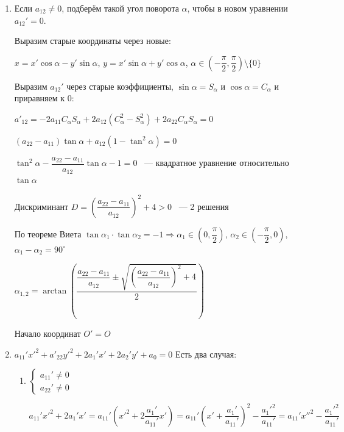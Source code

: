 \documentclass[twoside]{book}
\begin{document}
\begin{enumerate}
    \item Если \(a_{12} \neq 0\), подберём такой угол поворота \(\alpha\), чтобы в новом уравнении \(a_{12}' = 0\).

          Выразим старые координаты через новые:

          \(x = x' \cos \alpha - y' \sin \alpha\), \(y = x' \sin \alpha + y' \cos \alpha\), \(\alpha \in \left(-\dfrac{\pi}{2}, \dfrac{\pi}{2}\right) \setminus \{0\}\)

          Выразим \(a_{12}'\) через старые коэффициенты, \(\sin \alpha = S_\alpha\) и \(\cos \alpha = C_\alpha\) и приравняем к \(0\):

          \(a'_{12} = -2 a_{11} C_\alpha S_\alpha + 2 a_{12} (C_\alpha^2 - S_\alpha^2) + 2 a_{22} C_\alpha S_\alpha = 0\)

          \((a_{22} - a_{11}) \tan \alpha + a_{12} (1 - \tan^2 \alpha) = 0\)

          \(\tan^2 \alpha - \dfrac{a_{22} - a_{11}}{a_{12}} \tan \alpha - 1 = 0\) ~--- квадратное уравнение относительно \(\tan \alpha\)

          Дискриминант \(D = \left(\dfrac{a_{22} - a_{11}}{a_{12}}\right) ^ 2 + 4 > 0\) ~--- 2 решения

          По теореме Виета \(\tan \alpha_1 \cdot \tan \alpha_2 = -1 \Rightarrow \alpha_1 \in \left(0, \dfrac{\pi}{2}\right)\), \(\alpha_2 \in \left(-\dfrac{\pi}{2}, 0\right)\), \(\alpha_1 - \alpha_2 = 90^\circ\)

          \(\alpha_{1, 2} = \arctan\left(\dfrac{\dfrac{a_{22} - a_{11}}{a_{12}} \pm \sqrt{\left(\dfrac{a_{22} - a_{11}}{a_{12}}\right) ^ 2 + 4}}{2}\right)\)

          Начало координат \(O' = O\)

    \item \(a_{11}' x'^2 + a'_{22} y'^2 + 2 a_1' x' + 2 a_2' y' + a_0 = 0\)
          Есть два случая:
          \begin{enumerate}
              \item \(\begin{cases}
                        a_{11}' \neq 0 \\
                        a_{22}' \neq 0
                    \end{cases}\)

                    \(a_{11}' x'^2 + 2 a_1' x' = a_{11}' \left(x'^2 + 2 \dfrac{a_1'}{a_{11}'} x'\right) = a_{11}' \left(x' + \dfrac{a_1'}{a_{11}'}\right)^2 - \dfrac{a_1'^2}{a_{11}'} = a_{11}' x''^2 - \dfrac{a_1'^2}{a_{11}'}\)


\end{enumerate}
\end{enumerate}
\end{document}
